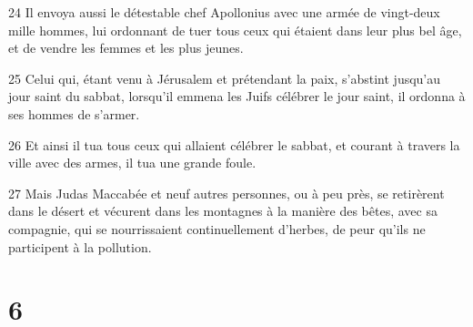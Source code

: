 \par 24 Il envoya aussi le détestable chef Apollonius avec une armée de vingt-deux mille hommes, lui ordonnant de tuer tous ceux qui étaient dans leur plus bel âge, et de vendre les femmes et les plus jeunes.
\par 25 Celui qui, étant venu à Jérusalem et prétendant la paix, s'abstint jusqu'au jour saint du sabbat, lorsqu'il emmena les Juifs célébrer le jour saint, il ordonna à ses hommes de s'armer.
\par 26 Et ainsi il tua tous ceux qui allaient célébrer le sabbat, et courant à travers la ville avec des armes, il tua une grande foule.
\par 27 Mais Judas Maccabée et neuf autres personnes, ou à peu près, se retirèrent dans le désert et vécurent dans les montagnes à la manière des bêtes, avec sa compagnie, qui se nourrissaient continuellement d'herbes, de peur qu'ils ne participent à la pollution.

\chapter{6}

